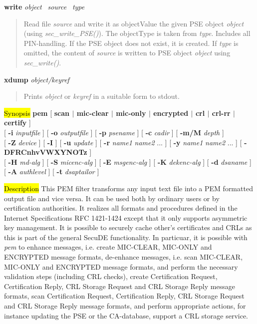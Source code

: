 {\bf write} {\em object}~ {\em source}~ {\em type}
\begin{quote}
Read file {\em source} and write it as objectValue the given PSE object {\em object} (using
{\em sec\_write\_PSE()}). The objectType is taken from {\em type}.
Includes all PIN-handling. If the PSE object does not exist, it is created.
If {\em type} is omitted, the content of {\em source} is written to PSE object
{\em object} using {\em sec\_write()}.
\end{quote}

{\bf xdump} {\em object/keyref} 
\begin{quote}
Prints {\em object} or {\em keyref} in a suitable form to stdout.
\end{quote}

\label{pem}
\hl{Synopsis}
{\bf pem} [ {\bf scan $|$ mic-clear $|$ mic-only $|$ encrypted $|$ crl $|$ crl-rr $|$ certify } ]
\\ \hspace*{0.95cm} 
[ {\bf -i} {\em inputfile} ] [ {\bf -o} {\em outputfile} ] [ {\bf -p} {\em psename} ] [ {\bf -c} {\em cadir} ] [ {\bf 
-m/M}  {\em depth} ] 
\\ \hspace*{0.95cm}
[ {\bf -Z} {\em device} ] [ {\bf -I} ] [ {\bf -u} {\em update} ] [ {\bf -r} {\em name1} {\em name2} ... ] [ {\bf -y} {\em name1} {\em name2} ... ] [ {\bf 
-DFRCnhvVWXYNOTz} ]
\\ \hspace*{0.95cm}
[ {\bf -H} {\em md-alg} ] [ {\bf -S} {\em micenc-alg} ] [ {\bf -E} {\em msgenc-alg} ] [ 
{\bf -K} {\em dekenc-alg} ] [ {\bf -d} {\em dsaname} ]
\\ \hspace*{0.95cm} [ {\bf -A} {\em authlevel} ] [ {\bf -t} {\em dsaptailor} ]

\hl{Description}
This PEM filter transforms any input text file into a PEM formatted output file 
and vice versa. It can be used both by ordinary users or by certification
authorities. It realizes all formats 
and procedures defined in the Internet Specifications RFC 1421-1424 
except that it only supports asymmetric key management. It is
possible to securely cache other's certificates and CRLs as this 
is part of the general SecuDE functionality. In particuar, it is possible
with {\em pem} to
\bi
   \m enhance messages, i.e. create MIC-CLEAR, MIC-ONLY and
      ENCRYPTED message formats,
   \m de-enhance messages, i.e. scan MIC-CLEAR, MIC-ONLY and
      ENCRYPTED message formats, and perform the necessary
      validation steps (including CRL checks),
   \m create Certification Request, Certification Reply, CRL Storage
      Request and CRL Storage Reply message formats,
   \m scan Certification Request, Certification Reply, CRL Storage
      Request and CRL Storage Reply message formats, and perform
      appropriate actions, for instance updating the PSE or
      the CA-database,
   \m support a CRL storage service.
\ei

